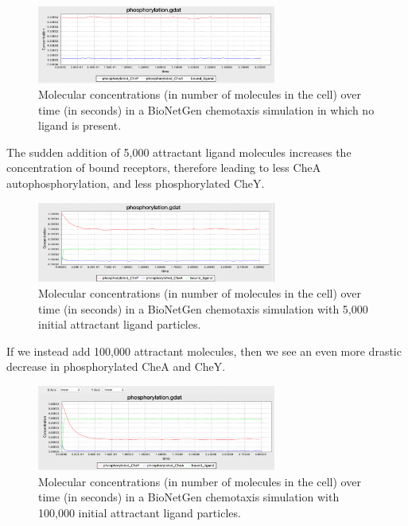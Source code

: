 \begin{figure}[h]
\centering
\mySfFamily
\includegraphics[width = 0.7\textwidth]{../images/chemotaxis_tutorial5.png}
\caption{Molecular concentrations (in number of molecules in the cell) over time (in seconds) in a BioNetGen chemotaxis simulation in which no ligand is present.}
\label{fig:chemotaxis_tutorial5}
\end{figure}

The sudden addition of 5,000 attractant ligand molecules increases the concentration of bound receptors, therefore leading to less CheA autophosphorylation, and less phosphorylated CheY.

\begin{figure}[h]
\centering
\mySfFamily
\includegraphics[width = 0.7\textwidth]{../images/chemotaxis_tutorial6.png}
\caption{Molecular concentrations (in number of molecules in the cell) over time (in seconds) in a BioNetGen chemotaxis simulation with 5,000 initial attractant ligand particles.}
\label{fig:chemotaxis_tutorial6}
\end{figure}


If we instead add 100,000 attractant molecules, then we see an even more drastic decrease in phosphorylated CheA and CheY.

\begin{figure}[h]
\centering
\mySfFamily
\includegraphics[width = 0.7\textwidth]{../images/chemotaxis_tutorial7.png}
\caption{Molecular concentrations (in number of molecules in the cell) over time (in seconds) in a BioNetGen chemotaxis simulation with 100,000 initial attractant ligand particles.}
\label{fig:chemotaxis_tutorial7}
\end{figure}


